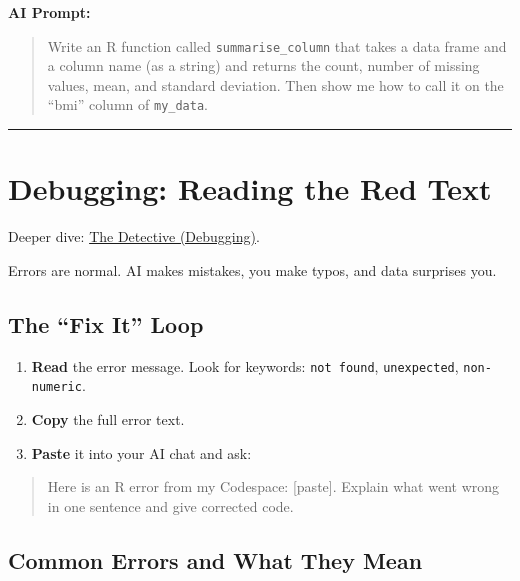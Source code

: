 \documentclass[
  letterpaper,
  DIV=11,
  numbers=noendperiod,
  oneside]{scrreprt}
\providecommand{\tightlist}{%
  \setlength{\itemsep}{0pt}\setlength{\parskip}{0pt}}
\begin{document}
\textbf{AI Prompt:}

\begin{quote}
Write an R function called \texttt{summarise\_column} that takes a data
frame and a column name (as a string) and returns the count, number of
missing values, mean, and standard deviation. Then show me how to call
it on the ``bmi'' column of \texttt{my\_data}.
\end{quote}

\begin{center}\rule{0.5\linewidth}{0.5pt}\end{center}

\section*{Debugging: Reading the Red
Text}\label{debugging-reading-the-red-text}


Deeper dive: \href{r06-debugging.qmd}{The Detective (Debugging)}.

Errors are normal. AI makes mistakes, you make typos, and data surprises
you.

\subsection*{The ``Fix It'' Loop}\label{the-fix-it-loop}

\begin{enumerate}
\def\labelenumi{\arabic{enumi}.}
\tightlist
\item
  \textbf{Read} the error message. Look for keywords:
  \texttt{not\ found}, \texttt{unexpected}, \texttt{non-numeric}.
\item
  \textbf{Copy} the full error text.
\item
  \textbf{Paste} it into your AI chat and ask:
\end{enumerate}

\begin{quote}
Here is an R error from my Codespace: {[}paste{]}. Explain what went
wrong in one sentence and give corrected code.
\end{quote}

\subsection*{Common Errors and What They
Mean}\label{common-errors-and-what-they-mean}
\end{document}
